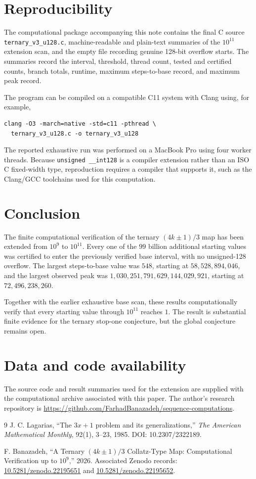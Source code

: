\documentclass[11pt]{article}
\begin{document}
\section{Reproducibility}
The computational package accompanying this note contains the final C source \texttt{ternary\_v3\_u128.c}, machine-readable and plain-text summaries of the $10^{11}$ extension scan, and the empty file recording genuine 128-bit overflow starts. The summaries record the interval, threshold, thread count, tested and certified counts, branch totals, runtime, maximum steps-to-base record, and maximum peak record.

The program can be compiled on a compatible C11 system with Clang using, for example,
\begin{verbatim}
clang -O3 -march=native -std=c11 -pthread \
  ternary_v3_u128.c -o ternary_v3_u128
\end{verbatim}
The reported exhaustive run was performed on a MacBook Pro using four worker threads. Because \texttt{unsigned \_\_int128} is a compiler extension rather than an ISO C fixed-width type, reproduction requires a compiler that supports it, such as the Clang/GCC toolchains used for this computation.

\section{Conclusion}
The finite computational verification of the ternary $(4k\pm1)/3$ map has been extended from $10^9$ to $10^{11}$. Every one of the $99$ billion additional starting values was certified to enter the previously verified base interval, with no unsigned-128 overflow. The largest steps-to-base value was $548$, starting at $58,528,894,046$, and the largest observed peak was $1,030,251,791,629,144,029,921$, starting at $72,496,238,260$.

Together with the earlier exhaustive base scan, these results computationally verify that every starting value through $10^{11}$ reaches $1$. The result is substantial finite evidence for the ternary stop-one conjecture, but the global conjecture remains open.

\section*{Data and code availability}
The source code and result summaries used for the extension are supplied with the computational archive associated with this paper. The author's research repository is \url{https://github.com/FarhadBanazadeh/sequence-computations}.

\begin{thebibliography}{9}
J. C. Lagarias, ``The $3x+1$ problem and its generalizations,'' \emph{The American Mathematical Monthly}, 92(1), 3--23, 1985. DOI: 10.2307/2322189.

F. Banazadeh, ``A Ternary $(4k\pm1)/3$ Collatz-Type Map: Computational Verification up to $10^9$,'' 2026. Associated Zenodo records: \href{https://doi.org/10.5281/zenodo.22195651}{10.5281/zenodo.22195651} and \href{https://doi.org/10.5281/zenodo.22195652}{10.5281/zenodo.22195652}.
\end{thebibliography}
\end{document}
